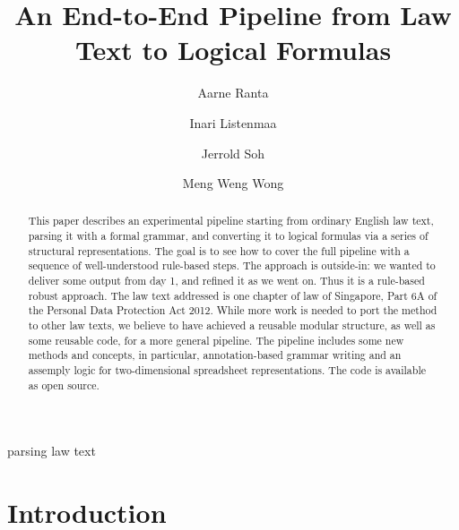 \documentclass{IOS-Book-Article}
\def\hb{\hbox to 11.5 cm{}}
\begin{document}
\pagestyle{headings}
\def\thepage{}
\begin{frontmatter}              %

\title{An End-to-End Pipeline from Law Text to Logical Formulas}

\markboth{}{August 2022\hb}

\author[A]{Aarne Ranta}
\author[B]{Inari Listenmaa}
\author[C]{Jerrold Soh}
\author[D]{Meng Weng Wong}

\address[A]{
  Department of Computer Science and Engineering,
  Chalmers University of Technology and University of Gothenburg,
  aarne.ranta@cse.gu.se
  }
\address[B]{SMU and Digital Grammars}
\address[C]{SMU}
\address[D]{SMU}

\begin{abstract}
This paper describes an experimental pipeline starting from ordinary English law text, parsing it with a formal grammar, and converting it to logical formulas via a series of structural representations.
The goal is to see how to cover the full pipeline with a sequence of well-understood rule-based steps.
The approach is outside-in: we wanted to deliver some output from day 1, and refined it as we went on.
Thus it is a rule-based robust approach.
The law text addressed is one chapter of law of Singapore, Part 6A of the Personal Data Protection Act 2012.
While more work is needed to port the method to other law texts, we believe to have achieved a reusable modular structure, as well as some reusable code, for a more general pipeline.
The pipeline includes some new methods and concepts, in particular, annotation-based grammar writing and an assemply logic for two-dimensional spreadsheet representations.
The code is available as open source.
\end{abstract}


\begin{keyword}
parsing law text
\end{keyword}
\end{frontmatter}
\markboth{August 2022\hb}{August 2022\hb}





\section{Introduction}
\end{document}
